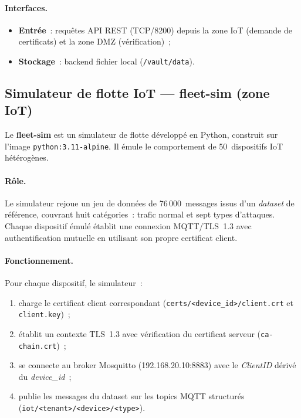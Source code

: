 \paragraph{Interfaces.}
\begin{itemize}[leftmargin=*]
  \item \textbf{Entrée}~: requêtes API REST (TCP/8200) depuis la zone IoT (demande de certificats) et la zone DMZ (vérification)~;
  \item \textbf{Stockage}~: backend fichier local (\texttt{/vault/data}).
\end{itemize}

\subsection{Simulateur de flotte IoT --- fleet-sim (zone IoT)}
\label{subsec:env-fleet}

Le \textbf{fleet-sim} est un simulateur de flotte développé en Python, construit sur l'image \texttt{python:3.11-alpine}. Il émule le comportement de 50~dispositifs IoT hétérogènes.

\paragraph{Rôle.}
Le simulateur rejoue un jeu de données de 76\,000~messages issus d'un \emph{dataset} de référence, couvrant huit catégories~: trafic normal et sept types d'attaques. Chaque dispositif émulé établit une connexion MQTT/TLS~1.3 avec authentification mutuelle en utilisant son propre certificat client.

\paragraph{Fonctionnement.}
Pour chaque dispositif, le simulateur~:
\begin{enumerate}[leftmargin=*]
  \item charge le certificat client correspondant (\texttt{certs/<device\_id>/client.crt} et \texttt{client.key})~;
  \item établit un contexte TLS~1.3 avec vérification du certificat serveur (\texttt{ca-chain.crt})~;
  \item se connecte au broker Mosquitto (192.168.20.10:8883) avec le \emph{ClientID} dérivé du \emph{device\_id}~;
  \item publie les messages du dataset sur les topics MQTT structurés (\texttt{iot/<tenant>/<device>/<type>}).
\end{enumerate}

